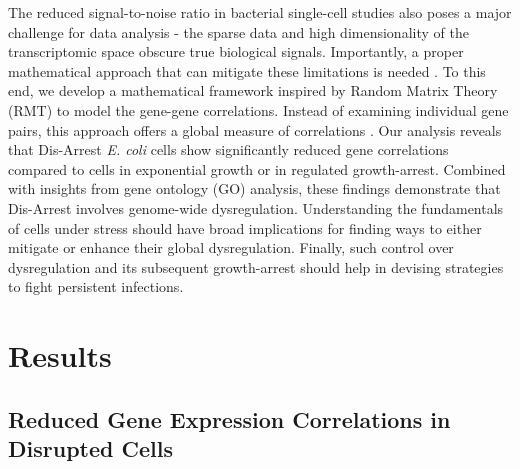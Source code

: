 \documentclass[12pt]{article}
\begin{document}
The reduced signal-to-noise ratio in bacterial single-cell studies also poses a major challenge for data analysis - the sparse data and high dimensionality of the transcriptomic space obscure true biological signals. Importantly, a proper mathematical approach that can mitigate these limitations is needed \cite{Kim2024, Eraslan2019, Marti2022.06.23.497402}. To this end, we develop a mathematical framework inspired by Random Matrix Theory (RMT) \cite{BUN20171,Laloux19991467,Ghosh2025.01.15.633183} to model the gene-gene correlations. Instead of examining individual gene pairs, this approach offers a global measure of correlations \cite{Levy2020}. Our analysis reveals that Dis-Arrest \textit{E. coli} cells show significantly reduced gene correlations compared to cells in exponential growth or in regulated growth-arrest. Combined with insights from gene ontology (GO) analysis, these findings demonstrate that Dis-Arrest involves genome-wide dysregulation. Understanding the fundamentals of cells under stress should have broad implications for finding ways to either mitigate or enhance their global dysregulation. Finally, such control over dysregulation and its subsequent growth-arrest should help in devising strategies to fight persistent infections.
\par

\section{Results}
\subsection{Reduced Gene Expression Correlations in Disrupted Cells}
\end{document}
